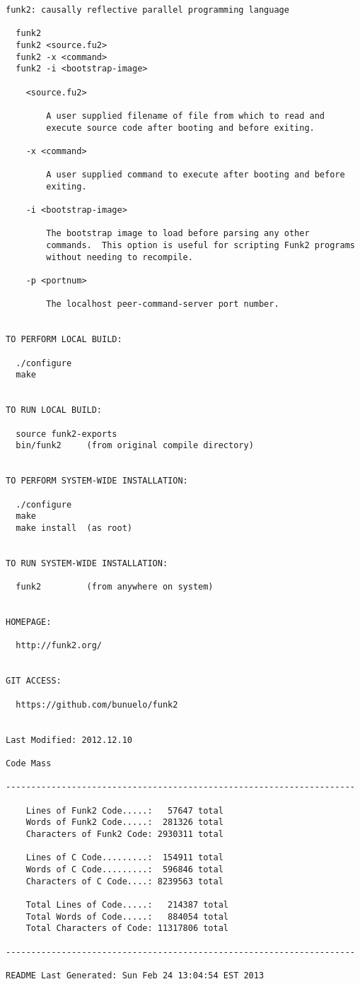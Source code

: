 \lstset{basicstyle=\scriptsize}
\begin{lstlisting}
funk2: causally reflective parallel programming language

  funk2
  funk2 <source.fu2>
  funk2 -x <command>
  funk2 -i <bootstrap-image>

    <source.fu2>

        A user supplied filename of file from which to read and
        execute source code after booting and before exiting.

    -x <command>

        A user supplied command to execute after booting and before
        exiting.

    -i <bootstrap-image>

        The bootstrap image to load before parsing any other
        commands.  This option is useful for scripting Funk2 programs
        without needing to recompile.

    -p <portnum>

        The localhost peer-command-server port number.


TO PERFORM LOCAL BUILD:

  ./configure
  make


TO RUN LOCAL BUILD:

  source funk2-exports
  bin/funk2     (from original compile directory)


TO PERFORM SYSTEM-WIDE INSTALLATION:

  ./configure
  make
  make install  (as root)


TO RUN SYSTEM-WIDE INSTALLATION:

  funk2         (from anywhere on system)


HOMEPAGE:

  http://funk2.org/


GIT ACCESS:

  https://github.com/bunuelo/funk2


Last Modified: 2012.12.10

Code Mass

---------------------------------------------------------------------

    Lines of Funk2 Code.....:   57647 total
    Words of Funk2 Code.....:  281326 total
    Characters of Funk2 Code: 2930311 total

    Lines of C Code.........:  154911 total
    Words of C Code.........:  596846 total
    Characters of C Code....: 8239563 total

    Total Lines of Code.....:   214387 total
    Total Words of Code.....:   884054 total
    Total Characters of Code: 11317806 total

---------------------------------------------------------------------

README Last Generated: Sun Feb 24 13:04:54 EST 2013
\end{lstlisting}

